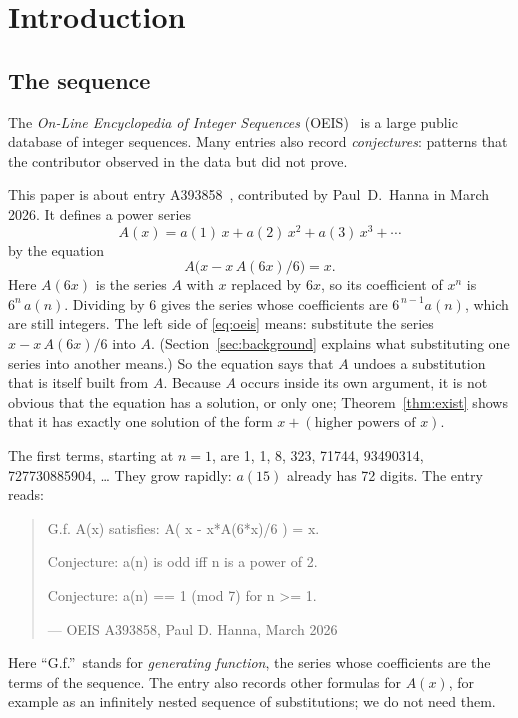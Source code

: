 \documentclass[11pt,a4paper]{article}
\theoremstyle{definition}
\theoremstyle{remark}
\begin{document}
\section{Introduction}

\subsection{The sequence}\label{sec:sequence}
The \emph{On-Line Encyclopedia of Integer Sequences} (OEIS)~\cite{oeisdb} is a large public database of integer
sequences. Many
entries also record \emph{conjectures}: patterns that the contributor observed in the data but did not prove.

This paper is about entry A393858~\cite{oeis}, contributed by Paul~D.~Hanna in March 2026. It defines a power series
\[
A(x)=a(1)\,x+a(2)\,x^2+a(3)\,x^3+\cdots
\]
by the equation
\begin{equation}\label{eq:oeis}
A\bigl(x-x\,A(6x)/6\bigr)=x.
\end{equation}
Here $A(6x)$ is the series $A$ with $x$ replaced by $6x$, so its coefficient of $x^n$ is
$6^n\,a(n)$. Dividing by $6$ gives the series whose coefficients are
$6^{\,n-1}a(n)$, which are still integers. The left side of \eqref{eq:oeis} means: substitute the series
$x-x\,A(6x)/6$ into $A$. (Section~\ref{sec:background} explains what substituting one
series into another means.) So the equation says that $A$ undoes a substitution that is itself built from $A$. Because
$A$ occurs inside its own argument, it is not obvious that the equation has a solution, or only one; Theorem~\ref{thm:exist}
shows that it has exactly one solution of the form $x+(\text{higher powers of }x)$.

The first terms, starting at $n=1$, are 1, 1, 8, 323, 71744, 93490314, 727730885904, \dots{} They grow rapidly: $a(15)$
already has 72 digits. The entry reads:
\begin{quote}\small\ttfamily\raggedright G.f. A(x) satisfies: A( x - x*A(6*x)/6 ) = x.\par\smallskip Conjecture: a(n) is odd iff n is a power of 2.\par\smallskip Conjecture: a(n) == 1 (mod 7) for n >= 1.\par\smallskip\hfill\textrm{--- OEIS A393858, Paul D. Hanna, March 2026}\end{quote}

Here ``G.f.''\ stands for \emph{generating function}, the series whose coefficients are the terms of the sequence.
The entry also records other formulas for $A(x)$, for example as an infinitely nested sequence of substitutions; we do
not need them.
\end{document}
